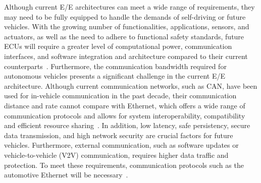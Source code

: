     Although current E/E architectures can meet a wide range of requirements, they may need to be fully equipped to handle the demands of self-driving or future vehicles. With the growing number of functionalities, applications, sensors, and actuators, as well as the need to adhere to functional safety standards, future ECUs will require a greater level of computational power, communication interfaces, and software integration and architecture compared to their current counterparts~\cite{askaripoor2022architecture}.
    Furthermore, the communication bandwidth required for autonomous vehicles presents a significant challenge in the current E/E architecture. Although current communication networks, such as CAN, have been used for in-vehicle communication in the past decade, their communication distance and rate cannot compare with Ethernet, which offers a wide range of communication protocols and allows for system interoperability, compatibility and efficient resource sharing~\cite{askaripoor2022architecture}. In addition, low latency, safe persistency, secure data transmission, and high network security are crucial factors for future vehicles. Furthermore, external communication, such as software updates or vehicle-to-vehicle (V2V) communication, requires higher data traffic and protection. To meet these requirements, communication protocols such as the automotive Ethernet will be necessary~\cite{askaripoor2022architecture, askaripoor2023designer}.






